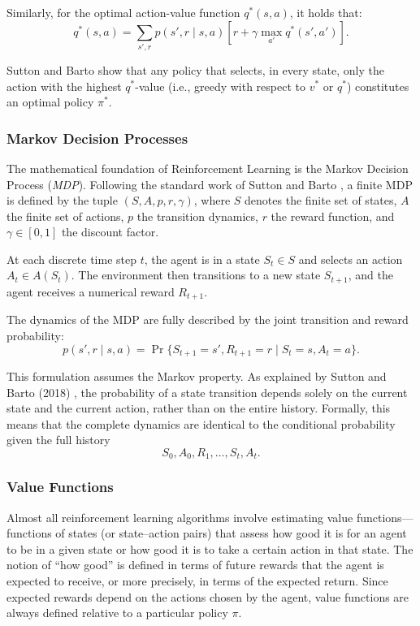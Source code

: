 Similarly, for the optimal action-value function \(q^*(s, a)\), it holds that:
\[
q^*(s, a) = \sum_{s', r} p(s', r \mid s, a) \left[r + \gamma \max_{a'} q^*(s', a')\right].
\]

Sutton and Barto \cite{sutton2018reinforcement} show that any policy that selects, in every state, only the action with the highest \(q^*\)-value (i.e., greedy with respect to \(v^*\) or \(q^*\)) constitutes an optimal policy \(\pi^*\).


\subsubsection{Markov Decision Processes}

The mathematical foundation of Reinforcement Learning is the Markov Decision Process (\textit{MDP}). Following the standard work of Sutton and Barto \cite{sutton2018reinforcement}, a finite MDP is defined by the tuple \((S, A, p, r, \gamma)\), where \(S\) denotes the finite set of states, \(A\) the finite set of actions, \(p\) the transition dynamics, \(r\) the reward function, and \(\gamma \in [0,1]\) the discount factor.

At each discrete time step \(t\), the agent is in a state \(S_t \in S\) and selects an action \(A_t \in A(S_t)\). The environment then transitions to a new state \(S_{t+1}\), and the agent receives a numerical reward \(R_{t+1}\).

The dynamics of the MDP are fully described by the joint transition and reward probability:
\[
p(s', r \mid s, a)
=
\Pr\{S_{t+1} = s', R_{t+1} = r \mid S_t = s, A_t = a\}.
\]

This formulation assumes the Markov property. As explained by Sutton and Barto (2018) \cite{sutton2018reinforcement}, the probability of a state transition depends solely on the current state and the current action, rather than on the entire history. Formally, this means that the complete dynamics are identical to the conditional probability given the full history
\[
S_0, A_0, R_1, \dots, S_t, A_t.
\]


\subsubsection{Value Functions}

Almost all reinforcement learning algorithms involve estimating value functions—functions of states (or state–action pairs) that assess how good it is for an agent to be in a given state or how good it is to take a certain action in that state. The notion of ``how good'' is defined in terms of future rewards that the agent is expected to receive, or more precisely, in terms of the expected return. Since expected rewards depend on the actions chosen by the agent, value functions are always defined relative to a particular policy \(\pi\).

